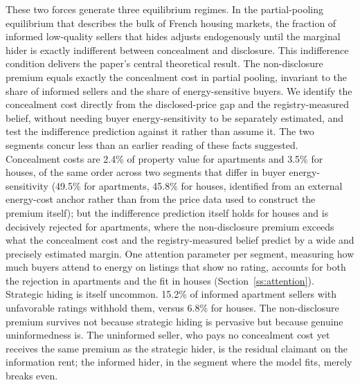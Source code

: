 These two forces generate three equilibrium regimes. In the partial-pooling equilibrium that describes the bulk of French housing markets, the fraction of informed low-quality sellers that hides adjusts endogenously until the marginal hider is exactly indifferent between concealment and disclosure. This indifference condition delivers the paper's central theoretical result. The non-disclosure premium equals exactly the concealment cost in partial pooling, invariant to the share of informed sellers and the share of energy-sensitive buyers. We identify the concealment cost directly from the disclosed-price gap and the registry-measured belief, without needing buyer energy-sensitivity to be separately estimated, and test the indifference prediction against it rather than assume it. The two segments concur less than an earlier reading of these facts suggested. Concealment costs are 2.4\% of property value for apartments and 3.5\% for houses, of the same order across two segments that differ in buyer energy-sensitivity (49.5\% for apartments, 45.8\% for houses, identified from an external energy-cost anchor rather than from the price data used to construct the premium itself); but the indifference prediction itself holds for houses and is decisively rejected for apartments, where the non-disclosure premium exceeds what the concealment cost and the registry-measured belief predict by a wide and precisely estimated margin. One attention parameter per segment, measuring how much buyers attend to energy on listings that show no rating, accounts for both the rejection in apartments and the fit in houses (Section~\ref{ss:attention}). %
Strategic hiding is itself uncommon. 15.2\% of informed apartment sellers with unfavorable ratings withhold them, versus 6.8\% for houses. The non-disclosure premium survives not because strategic hiding is pervasive but because genuine uninformedness is. The uninformed seller, who pays no concealment cost yet receives the same premium as the strategic hider, is the residual claimant on the information rent; the informed hider, in the segment where the model fits, merely breaks even.
